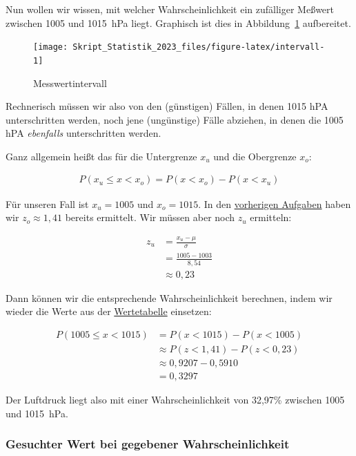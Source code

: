 \documentclass[
  11pt,
  ngerman,
  a4paper,
]{report}
\begin{document}
Nun wollen wir wissen, mit welcher Wahrscheinlichkeit ein zufälliger Meßwert zwischen 1005 und 1015~hPa liegt. Graphisch ist dies in Abbildung~\ref{fig:intervall} aufbereitet.

\begin{figure}[!h]

{\centering \texttt{[image: Skript\_Statistik\_2023\_files/figure-latex/intervall-1]} 

}

\caption{Messwertintervall}\label{fig:intervall}
\end{figure}

Rechnerisch müssen wir also von den (günstigen) Fällen, in denen 1015 hPA unterschritten werden, noch jene (ungünstige) Fälle abziehen, in denen die 1005 hPA \emph{ebenfalls} unterschritten werden.

Ganz allgemein heißt das für die Untergrenze \(x_u\) und die Obergrenze \(x_o\):

\[\begin{aligned}
    P(x_{u} \leq x < x_{o}) = P(x < x_{o}) - P(x < x_{u})
  \end{aligned}
  \label{eq:intervall}
\]

Für unseren Fall ist \(x_u=1005\) und \(x_o=1015\). In den \protect\hyperlink{unter}{vorherigen Aufgaben} haben wir \(z_o\approx1,41\) bereits ermittelt. Wir müssen aber noch \(z_u\) ermitteln:

\[\begin{aligned}
    z_u &= \frac{x_u-\mu}{\sigma} \\[4pt]
        &= \frac{1005-1003}{8{,}54}  \\[4pt]
        &\approx 0{,}23
\end{aligned}\]

Dann können wir die entsprechende Wahrscheinlichkeit berechnen, indem wir wieder die Werte aus der \protect\hyperlink{tabelle-z}{Wertetabelle} einsetzen:

\[
  \begin{aligned}
    P(1005 \leq x < 1015) &= P(x < 1015) - P(x < 1005) \\
    &\approx P(z < 1{,}41) - P(z < 0{,}23) \\
    &\approx 0{,}9207- 0{,}5910  \\
    &= 0{,}3297
  \end{aligned}
  \]

Der Luftdruck liegt also mit einer Wahrscheinlichkeit von 32,97\% zwischen 1005 und 1015~hPa.

\hypertarget{gesuchter-wert-bei-gegebener-wahrscheinlichkeit}{%
\subsubsection{Gesuchter Wert bei gegebener Wahrscheinlichkeit}\label{gesuchter-wert-bei-gegebener-wahrscheinlichkeit}}
\end{document}
